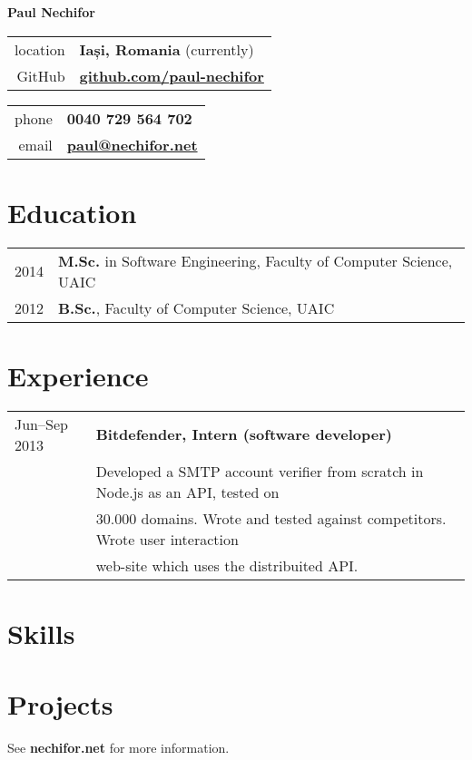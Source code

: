 \documentclass[a4wide]{article}
\newcommand{\sub}[1]{\section*{#1}}
\begin{document}
\thispagestyle{empty}

\centerline{\LARGE \bf Paul Nechifor}
\vspace{1cm}

\begin{minipage}{0.50\linewidth}
\begin{center}
\begin{tabular}{rl}
  location& {\bf Iași, Romania} (currently)\\
  GitHub& \href{http://github.com/paul-nechifor}{\bf github.com/paul-nechifor}
\end{tabular}
\end{center}
\end{minipage}
\begin{minipage}{0.50\linewidth}
\begin{center}
\begin{tabular}{rl}
  phone& {\bf 0040 729 564 702}\\
  email& \href{mailto:paul@nechifor.net}{\bf paul@nechifor.net}\\
\end{tabular}
\end{center}
\end{minipage}

\sub{Education}

\begin{tabular}{ll}
	2014 & {\bf M.Sc.} in Software Engineering, Faculty of Computer Science, UAIC\\
	2012 & {\bf B.Sc.}, Faculty of Computer Science, UAIC\\
\end{tabular}

\sub{Experience}

\begin{tabular}{ll}
	Jun--Sep 2013&	{\bf Bitdefender, Intern (software developer)}\\
	  & Developed a SMTP account verifier from scratch in Node.js as an API, tested on\\
	  & 30.000 domains. Wrote and tested against competitors. Wrote user interaction\\
    & web-site which uses the distribuited API.\\
\end{tabular}

\sub{Skills}

\sub{Projects}

\vspace{2cm}
\centerline{See \textbf{nechifor.net} for more information.}
\end{document}
